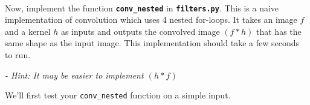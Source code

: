 \documentclass[11pt]{article}
\begin{document}
    \begin{center}
    \end{center}
    { \hspace*{\fill} \\}
    
    Now, implement the function \textbf{\texttt{conv\_nested}} in
\textbf{\texttt{filters.py}}. This is a naive implementation of
convolution which uses 4 nested for-loops. It takes an image \(f\) and a
kernel \(h\) as inputs and outputs the convolved image \((f*h)\) that
has the same shape as the input image. This implementation should take a
few seconds to run.

\emph{- Hint: It may be easier to implement \((h*f)\)}

    We'll first test your \texttt{conv\_nested} function on a simple input.
\end{document}
